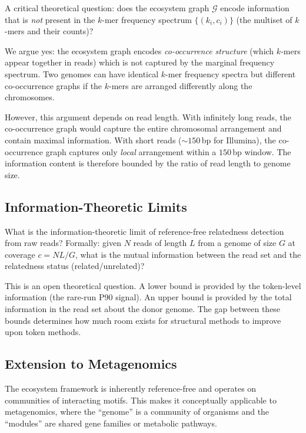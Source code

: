\documentclass{../yalumba}
\begin{document}
A critical theoretical question: does the ecosystem graph $\mathcal{G}$
encode information that is \emph{not} present in the $k$-mer frequency
spectrum $\{(k_i, c_i)\}$ (the multiset of $k$-mers and their counts)?

We argue yes: the ecosystem graph encodes \emph{co-occurrence structure}
(which $k$-mers appear together in reads) which is not captured by the
marginal frequency spectrum.  Two genomes can have identical $k$-mer
frequency spectra but different co-occurrence graphs if the $k$-mers
are arranged differently along the chromosomes.

However, this argument depends on read length.  With infinitely long
reads, the co-occurrence graph would capture the entire chromosomal
arrangement and contain maximal information.  With short reads
(${\sim}150$\,bp for Illumina), the co-occurrence graph captures only
\emph{local} arrangement within a $150$\,bp window.  The
information content is therefore bounded by the ratio of read length to
genome size.

\subsection{Information-Theoretic Limits}
\label{sec:open:info}

What is the information-theoretic limit of reference-free relatedness
detection from raw reads?  Formally: given $N$ reads of length $L$ from
a genome of size $G$ at coverage $c = NL/G$, what is the mutual
information between the read set and the relatedness status
(related/unrelated)?

This is an open theoretical question.  A lower bound is provided by
the token-level information (the rare-run P90 signal).  An upper bound
is provided by the total information in the read set about the donor
genome.  The gap between these bounds determines how much room exists
for structural methods to improve upon token methods.

\subsection{Extension to Metagenomics}
\label{sec:open:meta}

The ecosystem framework is inherently reference-free and operates on
communities of interacting motifs.  This makes it conceptually
applicable to metagenomics, where the ``genome'' is a community of
organisms and the ``modules'' are shared gene families or metabolic
pathways.
\end{document}
